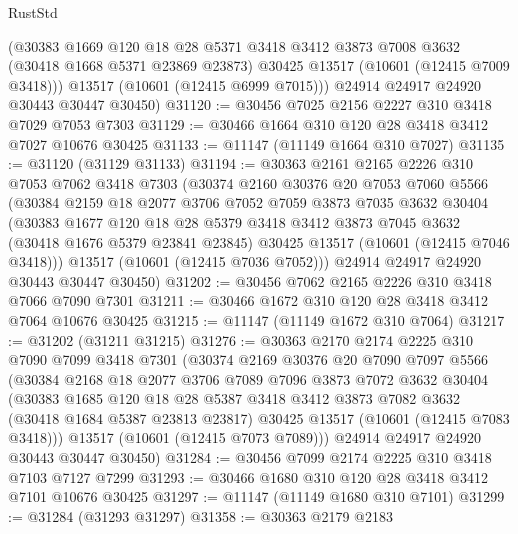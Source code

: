 \begin{lexlean}{RustStd}
\begin{coremodule}
        (@30383
          @1669
          @120
          @18
          @28
          @5371
          @3418
          @3412
          @3873
          @7008
          @3632
          (@30418 @1668 @5371 @23869 @23873)
          @30425
          @13517
          (@10601 (@12415 @7009 @3418)))
        @13517
        (@10601 (@12415 @6999 @7015)))
      @24914
      @24917
      @24920
      @30443
      @30447
      @30450)
@31120 := @30456 @7025 @2156 @2227 @310 @3418 @7029 @7053 @7303
@31129 := @30466 @1664 @310 @120 @28 @3418 @3412 @7027 @10676 @30425
@31133 := @11147 (@11149 @1664 @310 @7027)
@31135 := @31120 (@31129 @31133)
@31194 := @30363
    @2161
    @2165
    @2226
    @310
    @7053
    @7062
    @3418
    @7303
    (@30374
      @2160
      @30376
      @20
      @7053
      @7060
      @5566
      (@30384
        @2159
        @18
        @2077
        @3706
        @7052
        @7059
        @3873
        @7035
        @3632
        @30404
        (@30383
          @1677
          @120
          @18
          @28
          @5379
          @3418
          @3412
          @3873
          @7045
          @3632
          (@30418 @1676 @5379 @23841 @23845)
          @30425
          @13517
          (@10601 (@12415 @7046 @3418)))
        @13517
        (@10601 (@12415 @7036 @7052)))
      @24914
      @24917
      @24920
      @30443
      @30447
      @30450)
@31202 := @30456 @7062 @2165 @2226 @310 @3418 @7066 @7090 @7301
@31211 := @30466 @1672 @310 @120 @28 @3418 @3412 @7064 @10676 @30425
@31215 := @11147 (@11149 @1672 @310 @7064)
@31217 := @31202 (@31211 @31215)
@31276 := @30363
    @2170
    @2174
    @2225
    @310
    @7090
    @7099
    @3418
    @7301
    (@30374
      @2169
      @30376
      @20
      @7090
      @7097
      @5566
      (@30384
        @2168
        @18
        @2077
        @3706
        @7089
        @7096
        @3873
        @7072
        @3632
        @30404
        (@30383
          @1685
          @120
          @18
          @28
          @5387
          @3418
          @3412
          @3873
          @7082
          @3632
          (@30418 @1684 @5387 @23813 @23817)
          @30425
          @13517
          (@10601 (@12415 @7083 @3418)))
        @13517
        (@10601 (@12415 @7073 @7089)))
      @24914
      @24917
      @24920
      @30443
      @30447
      @30450)
@31284 := @30456 @7099 @2174 @2225 @310 @3418 @7103 @7127 @7299
@31293 := @30466 @1680 @310 @120 @28 @3418 @3412 @7101 @10676 @30425
@31297 := @11147 (@11149 @1680 @310 @7101)
@31299 := @31284 (@31293 @31297)
@31358 := @30363
    @2179
    @2183

\end{coremodule}
\end{lexlean}

